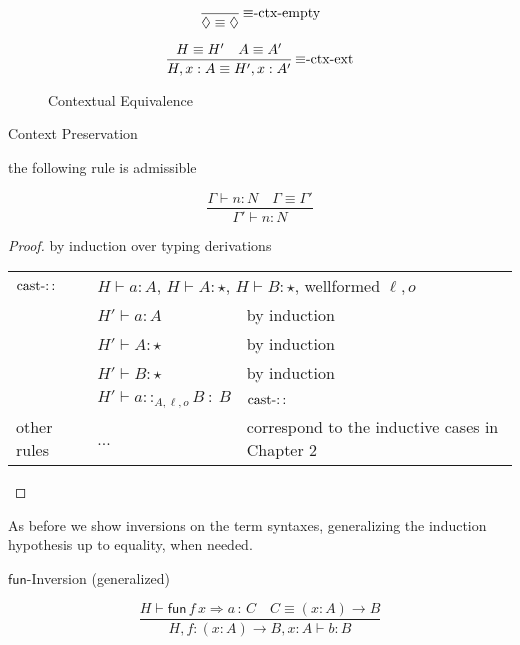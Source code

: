 \begin{figure}
\[
\frac{\ }{\lozenge\equiv\lozenge}\,\textrm{\ensuremath{\equiv}-ctx-empty}
\]

\[
\frac{H\equiv H'\quad A\equiv A'}{H,x:A\equiv H',x:A'}\,\textrm{\ensuremath{\equiv}-ctx-ext}
\]

\caption{Contextual Equivalence}
\label{fig:surface-Context-Equiv}
\end{figure}

\begin{lem}
Context Preservation

the following rule is admissible

\[
\frac{\Gamma\vdash n:N\quad\Gamma\equiv\Gamma'}{\Gamma'\vdash n:N}
\]
\end{lem}

\begin{proof}
by induction over typing derivations

\begin{tabular}{lll}
$\operatorname{cast-::}$ & \multicolumn{2}{l}{$H\vdash a:A$, $H\vdash A:\star$, $H\vdash B:\star$, wellformed
$\ensuremath{\ell},o$}\tabularnewline
 & $H'\vdash a:A$ & by induction\tabularnewline
 & $H'\vdash A:\star$ & by induction\tabularnewline
 & $H'\vdash B:\star$ & by induction\tabularnewline
 & $H'\vdash a::_{A,\ensuremath{\ell},o}B\::\:B$ & $\operatorname{cast-::}$\tabularnewline
other rules & ... & correspond to the inductive cases in Chapter 2\tabularnewline
\end{tabular}
\end{proof}
As before we show inversions on the term syntaxes, generalizing the
induction hypothesis up to equality, when needed.
\begin{lem}
$\mathsf{fun}$-Inversion (generalized)

\[
\frac{H\vdash\mathsf{fun}\,f\,x\Rightarrow a\,:\,C\quad C\equiv\left(x:A\right)\rightarrow B}{H,f:\left(x:A\right)\rightarrow B,x:A\vdash b:B}
\]
\end{lem}

